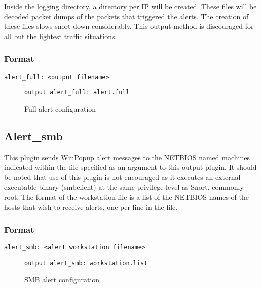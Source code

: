\documentclass[english]{report}
\begin{document}
Inside the logging directory, a directory per IP will be created.
These files will be decoded packet dumps of the packets that triggered
the alerts. The creation of these files slows snort down considerably.
This output method is discouraged for all but the lightest traffic
situations.


\subsubsection{Format}

\begin{verbatim}
alert_full: <output filename>
\end{verbatim}
%
\begin{figure}[!hbpt]
\begin{verbatim}
output alert_full: alert.full
\end{verbatim}

\caption{\label{full alert configuration}Full alert configuration}
\end{figure}



\subsection{Alert\_smb}

This plugin sends WinPopup alert messages to the NETBIOS named machines
indicated within the file specified as an argument to this output
plugin. It should be noted that use of this plugin is not encouraged
as it executes an external executable binary (smbclient) at the same
privilege level as Snort, commonly root. The format of the workstation
file is a list of the NETBIOS names of the hosts that wish to receive
alerts, one per line in the file.


\subsubsection{Format}

\begin{verbatim}
alert_smb: <alert workstation filename>
\end{verbatim}
%
\begin{figure}[!hbpt]
\begin{verbatim}
output alert_smb: workstation.list
\end{verbatim}

\caption{\label{smb alert configuration} SMB alert configuration}
\end{figure}
\end{document}
